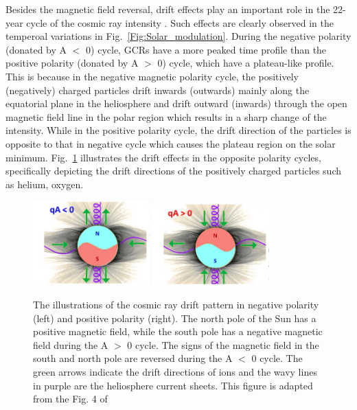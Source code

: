 Besides the magnetic field reversal, drift effects play an important role in the 22-year cycle of the cosmic ray intensity \citep{Jokipii1977ApJ}. Such effects are clearly observed in the temperoal variations in Fig.~\ref{Fig:Solar_modulation}.
During the negative polarity (donated by A $<$ 0) cycle, \acp{GCR} have a more peaked time profile than the positive polarity (donated by A $>$ 0) cycle, which have a plateau-like profile. 
This is because in the negative magnetic polarity cycle, the positively (negatively) charged particles drift inwards (outwards) mainly along the equatorial plane in the heliosphere and drift outward (inwards) through the open magnetic field line in the polar region which results in a sharp change of the intensity. While in the positive polarity cycle, the drift direction of the particles is opposite to that in negative cycle which causes the plateau region on the solar minimum. Fig.~\ref{Fig:drift_effect} illustrates the drift effects in the opposite polarity cycles, specifically depicting the drift directions of the positively charged particles such as helium, oxygen.

\begin{figure}
	\centering
	\includegraphics[width = 0.4\textwidth]{images/drift_effect.png}
	\includegraphics[width = 0.4\textwidth]{images/drift_effect_2.png}
	\caption[The gloabl drift pattern of positively charged particles in different polarity]{The illustrations of the cosmic ray drift pattern in negative polarity (left) and positive polarity (right). The north pole of the Sun has a positive magnetic field, while the south pole has a negative magnetic field during the A $>$ 0 cycle. The signs of the magnetic field in the south and north pole are reversed during the A $<$ 0 cycle. The green arrows indicate the drift directions of ions and the wavy lines in purple are the heliosphere current sheets. This figure is adapted from the Fig. 4 of \citep{Rankin2022ApJ}}
	\label{Fig:drift_effect}	
\end{figure}

